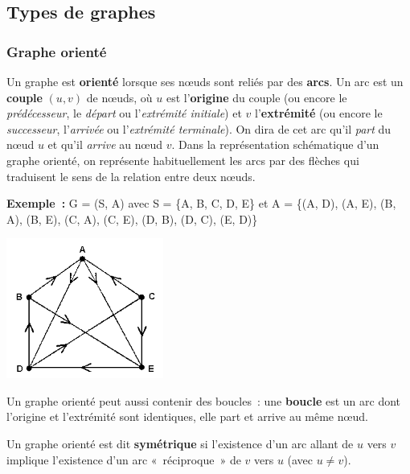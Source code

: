 	\subsection{Types de graphes}
	
		\subsubsection{Graphe orienté}
		
			Un graphe est \textbf{orienté} lorsque ses n{\oe}uds 
			sont reliés par des \textbf{arcs}. Un arc est un \textbf{couple}
			$(u, v)$ de n{\oe}uds, où $u$ est l'\textbf{origine} du couple 
			(ou encore le \textit{prédécesseur}, le	\textit{départ} ou 
			l'\textit{extrémité initiale}) et $v$ l'\textbf{extrémité} 
			(ou encore le \textit{successeur}, l'\textit{arrivée} ou 
			l'\textit{extrémité terminale}). On dira de cet arc qu'il 
			\textit{part} du n{\oe}ud $u$ et qu'il \textit{arrive} au 
			n{\oe}ud $v$. Dans la représentation schématique d'un graphe 
			orienté, on représente habituellement les arcs par des flèches 
			qui traduisent le sens de la relation entre deux n{\oe}uds.

			\textbf{Exemple~:} G = (S, A) avec S = \{A, B, C, D, E\} et 
			A = \{(A, D), (A, E), (B, A), (B, E), (C, A), (C, E), (D, B), (D, C),
			(E, D)\}

			\begin{center}
			\includegraphics[width=5.159cm,height=4.598cm]{image/a2012Logique2eme-img042.png}
			\end{center}
			
			Un graphe orienté peut aussi contenir des boucles~: 
			une \textbf{boucle} est un arc dont l'origine et l'extrémité sont
			identiques, elle part et arrive au même n{\oe}ud.

			Un graphe orienté est dit \textbf{symétrique} si l'existence 
			d'un arc allant de $u$ vers $v$ implique l'existence d'un arc 
			«~réciproque~» de $v$ vers $u$ (avec $u \neq v$).
			

